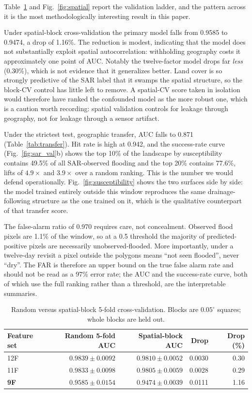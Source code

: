 \documentclass[10pt,twocolumn]{article}
\begin{document}
Table~\ref{tab:spatial} and Fig.~\ref{fig:spatial} report the validation
ladder, and the pattern across it is the most methodologically interesting result
in this paper.

Under spatial-block cross-validation the primary model falls from 0.9585 to
0.9474, a drop of 1.16\%. The reduction is modest, indicating that the model
does not substantially exploit spatial autocorrelation: withholding geography
costs it approximately one point of AUC. Notably the twelve-factor model drops far \emph{less}
(0.30\%), which is not evidence that it generalizes better. Land cover is so
strongly predictive of the SAR label that it swamps the spatial structure, so the
block-CV control has little left to remove. A spatial-CV score taken in isolation
would therefore have ranked the confounded model as the more robust one, which is
a caution worth recording: spatial validation controls for leakage through
geography, not for leakage through a sensor artifact.

Under the strictest test, geographic transfer, AUC falls to 0.871
(Table~\ref{tab:transfer}). Hit rate is high at 0.942, and the success-rate curve
(Fig.~\ref{fig:sar_val}b) shows the top 10\% of the landscape by susceptibility
contains 49.5\% of all SAR-observed flooding and the top 20\% contains 77.6\%,
lifts of $4.9\times$ and $3.9\times$ over a random ranking. This is the number we
would defend operationally. Fig.~\ref{fig:susceptibility} shows the two
surfaces side by side: the model trained entirely outside this window
reproduces the same drainage-following structure as the one trained on it,
which is the qualitative counterpart of that transfer score.

The false-alarm ratio of 0.970 requires care, not concealment. Observed
flood pixels are 1.1\% of the window, so at a 0.5 threshold the majority of
predicted-positive pixels are necessarily unobserved-flooded. More importantly,
under a twelve-day revisit a pixel outside the polygons means ``not seen
flooded'', never ``dry''. The FAR is therefore an upper bound on the true false
alarm rate and should not be read as a 97\% error rate; the AUC and the
success-rate curve, both of which use the full ranking rather than a threshold,
are the interpretable summaries.

\begin{table}[!t]
\centering\footnotesize
\caption{Random versus spatial-block 5-fold cross-validation. Blocks are
$0.05^\circ$ squares; whole blocks are held out.}
\label{tab:spatial}
\small
\begin{tabular}{@{}lrrrr@{}}
\toprule
\textbf{Feature set} & \textbf{Random 5-fold AUC} & \textbf{Spatial-block AUC} &
\textbf{Drop} & \textbf{Drop (\%)} \\
\midrule
12F & $0.9839\pm0.0092$ & $0.9810\pm0.0052$ & 0.0030 & 0.30 \\
11F & $0.9833\pm0.0098$ & $0.9805\pm0.0059$ & 0.0028 & 0.29 \\
\textbf{9F} & $0.9585\pm0.0154$ & $0.9474\pm0.0039$ & 0.0111 & 1.16 \\
\bottomrule
\end{tabular}
\end{table}
\end{document}
